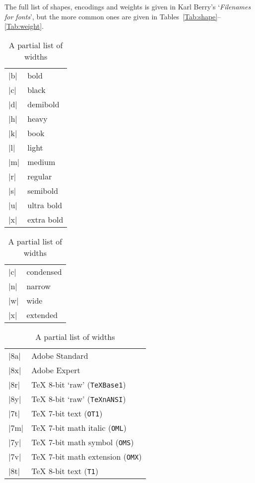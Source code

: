 \documentclass[a4paper]{ltxguide}
\begin{document}
The full list of shapes, encodings and weights is given in Karl
Berry's `\emph{Filenames for fonts}', but the more common ones are
given in Tables~\ref{Tab:shape}--\ref{Tab:weight}.

\begin{table}
\begin{minipage}{0.5\textwidth}
  \small
  \begin{tabular}{ll}
    |b| & bold \\
    |c| & black \\
    |d| & demibold \\
    |h| & heavy \\
    |k| & book \\
    |l| & light \\
    |m| & medium \\
    |r| & regular \\
    |s| & semibold \\
    |u| & ultra bold \\
    |x| & extra bold \\
  \end{tabular}
  \caption{A partial list of weights}
  \label{Tab:weight}
  \begin{tabular}{ll}
    |c| & condensed \\
    |n| & narrow \\
    |w| & wide \\
    |x| & extended \\
  \end{tabular}
  \caption{A partial list of widths}
  \label{Tab:width}
\end{minipage}
\begin{minipage}{0.5\textwidth}
  \small
  \begin{tabular}{ll}
   |8a| & Adobe Standard        \\
   |8x| & Adobe Expert          \\
   |8r| & \TeX{} 8-bit `raw' (\texttt{TeXBase1})        \\
   |8y| & \TeX{} 8-bit `raw' (\texttt{TeXnANSI})        \\
   |7t| & \TeX{} 7-bit text             (\texttt{OT1})  \\
   |7m| & \TeX{} 7-bit math italic      (\texttt{OML})  \\
   |7y| & \TeX{} 7-bit math symbol      (\texttt{OMS})  \\
   |7v| & \TeX{} 7-bit math extension   (\texttt{OMX})  \\
   |8t| & \TeX{} 8-bit text             (\texttt{T1})   \\

\end{tabular}
\end{minipage}
\end{table}
\end{document}
